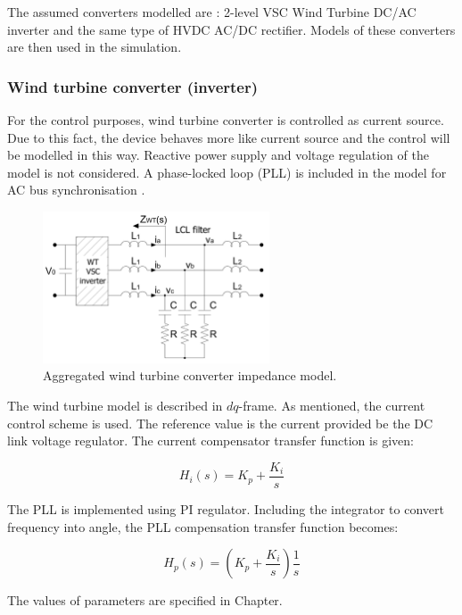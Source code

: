 \documentclass[12pt]{report} %
\begin{document}
The assumed converters modelled are \cite{liusun2014}: 2-level VSC Wind Turbine DC/AC inverter and the same type of HVDC AC/DC rectifier. Models of these converters are then used in the simulation.

\subsubsection{Wind turbine converter (inverter)}
For the control purposes, wind turbine converter is controlled as current source. Due to this fact, the device behaves more like current source and the control will be modelled in this way. Reactive power supply and voltage regulation of the model is not considered. A phase-locked loop (PLL) is included in the model for AC bus synchronisation \cite{liusun2014}.

\begin{figure}[htb]
	\centering
    	\includegraphics[width=0.6\textwidth]{img/theory/WT_scheme.png}
  	\caption{Aggregated wind turbine converter impedance model.}
  	\label{fig:wtscheme}
\end{figure}
\FloatBarrier

The wind turbine model is described in $dq$-frame. As mentioned, the current control scheme is used. The reference value is the current provided be the DC link voltage regulator. The current compensator transfer function is given:

\begin{equation}
	H_i (s)=K_p +\dfrac{K_i}{s}
\end{equation}

The PLL is implemented using PI regulator. Including the integrator to convert frequency into angle, the PLL compensation transfer function becomes:

\begin{equation}
	H_p (s)=\left ( K_p +\dfrac{K_i}{s} \right )\dfrac{1}{s}
\end{equation}

The values of parameters are specified in Chapter.
\end{document}
